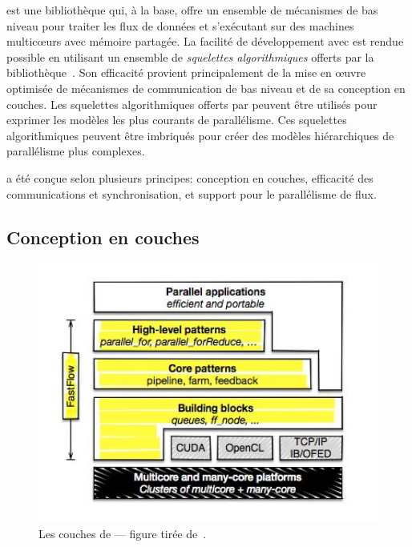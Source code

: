  est une biblioth\`eque  qui, \`a la base, offre un ensemble de m\'ecanismes de bas niveau pour traiter les flux de donn\'ees et s'ex\'ecutant sur des machines multicœurs avec m\'emoire partag\'ee. La facilit\'e de d\'eveloppement avec  est rendue possible en utilisant un ensemble de \emph{squelettes algorithmiques} offerts par la biblioth\`eque~\citep{AldinucciEtAl14}. Son efficacit\'e provient principalement de la mise en œuvre optimis\'ee de m\'ecanismes de communication de bas niveau et de sa conception en couches. Les squelettes algorithmiques offerts par  peuvent \^etre utilis\'es pour exprimer les mod\`eles les plus courants de parall\'elisme. Ces squelettes algorithmiques peuvent \^etre imbriqu\'es pour cr\'eer des mod\`eles hi\'erarchiques de parall\'elisme plus complexes.

 a \'et\'e conçue selon plusieurs principes: conception en couches, efficacit\'e des communications et synchronisation, et support pour le parall\'elisme de flux.

\subsection{Conception en couches}

\begin{figure}
\centering
     \includegraphics[width=1.0\textwidth]{Figures/FastFlowLayers.jpg}
      \caption[Les couches de .]{Les couches de  --- figure tir\'ee de~\citep{Torquati15}.}
       \label{FastFlowLayers.fig}
\end{figure}


